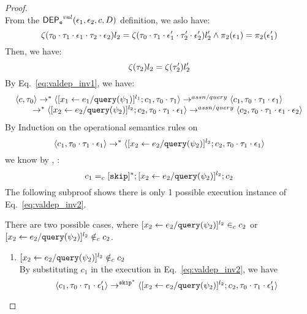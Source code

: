 {\begin{proof}
\begin{equation}
\end{equation}
%
From the $\mathsf{DEP_{\mathtt{e}}}^{val}(\mathtt{\epsilon}_1, \mathtt{\epsilon}_2, c, D)$ definition, we aslo have:
\[
  \mathtt{\zeta}(\mathtt{\tau}_0 \cdot \mathtt{\tau}_1 \cdot \mathtt{\epsilon}_1 \cdot \mathtt{\tau}_2 \cdot \mathtt{\epsilon}_2) l_2 = 
  \mathtt{\zeta}(\mathtt{\tau}_0 \cdot \mathtt{\tau}_1 \cdot \mathtt{\epsilon}_1' \cdot \mathtt{\tau}_2' \cdot \mathtt{\epsilon}_2') l_2'
  \land 
  \pi_2(\mathtt{\epsilon}_1) = \pi_2(\mathtt{\epsilon}_1')
\] 
Then, we have:
\begin{equation}
\label{eq:valdep_invn}
   \mathtt{\zeta}(\mathtt{\tau}_2) l_2 = 
  \mathtt{\zeta}(\mathtt{\tau}_2') l_2'
\end{equation}
%
%
%
 By Eq.~\ref{eq:valdep_inv1}, we have:
\[
  \begin{array}{l}   
\langle {c}, \mathtt{\tau}_0 \rangle \rightarrow^{*} 
\langle [\mathrel{ {x}_1 \leftarrow e_1 / {\tt query}(\psi_1) }]^{l_1} ; {c}_1, \mathtt{\tau}_0 \cdot \mathtt{\tau}_1 \rangle  \rightarrow^{assn/query}
 \langle c_1, \mathtt{\tau}_0 \cdot \mathtt{\tau}_1 \cdot \mathtt{\epsilon}_1 \rangle \\
  \qquad \rightarrow^{*} 
  \langle [\mathrel{ {x}_2 \leftarrow e_2 / {\tt query}(\psi_2) }]^{l_2};{c}_2, 
  \mathtt{\tau}_0 \cdot \mathtt{\tau}_1 \cdot \mathtt{\epsilon}_1 \rangle 
  \rightarrow^{assn/query} 
  \langle {c}_2,  \mathtt{\tau}_0 \cdot \mathtt{\tau}_1 \cdot \mathtt{\epsilon}_1 \cdot \mathtt{\epsilon}_2 \rangle 
\end{array}
 \]
 By Induction on the operational semantics rules on 
 \[\langle c_1, \mathtt{\tau}_0 \cdot \mathtt{\tau}_1 \cdot \mathtt{\epsilon}_1 \rangle
  \rightarrow^{*} 
  \langle [\mathrel{ {x}_2 \leftarrow e_2 / {\tt query}(\psi_2) }]^{l_2};{c}_2, 
  \mathtt{\tau}_0 \cdot \mathtt{\tau}_1 \cdot \mathtt{\epsilon}_1 \rangle \]
 we know by  , :
 \[
 c_1 =_c 
 [\mathtt{skip}]{}^*;[\mathrel{ {x}_2 \leftarrow e_2 / {\tt query}(\psi_2) }]^{l_2};{c}_2
 \]
The following subproof shows there is only 1 possible execution instance of Eq.~\ref{eq:valdep_inv2}.
\begin{subproof}[Subproof]
\label{pf:noiteration_inv2}
There are two possible cases, 
where $[\mathrel{ {x}_2 \leftarrow e_2 / {\tt query}(\psi_2) }]^{l_2} \in_c c_2$ 
or $[\mathrel{ {x}_2 \leftarrow e_2 / {\tt query}(\psi_2) }]^{l_2} \notin_c c_2$.
%
\begin{enumerate}
\item{$[\mathrel{ {x}_2 \leftarrow e_2 / {\tt query}(\psi_2) }]^{l_2}\notin_c c_2$}
\\
By substituting $c_1$ in the execution in Eq.~\ref{eq:valdep_inv2}, we have 
  \[
  \langle c_1, \mathtt{\tau}_0 \cdot \mathtt{\tau}_1 \cdot \mathtt{\epsilon}_1' \rangle 
  \rightarrow^{\mathtt{skip}^*} 
  \langle [\mathrel{ {x}_2 \leftarrow e_2 / {\tt query}(\psi_2) }]^{l_2} ; {c}_2, \mathtt{\tau}_0 \cdot \mathtt{\tau}_1 \cdot \mathtt{\epsilon}_1' \rangle 
\]
\end{enumerate}
\end{subproof}
\end{proof}}
